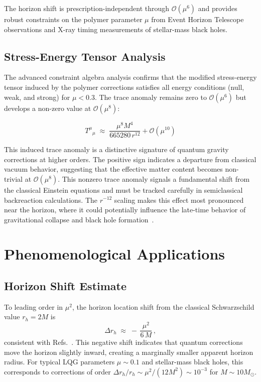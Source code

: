 \documentclass[11pt]{article}
\begin{document}
The horizon shift is prescription-independent through $\mathcal{O}(\mu^6)$ and provides robust constraints on the polymer parameter $\mu$ from Event Horizon Telescope observations and X-ray timing measurements of stellar-mass black holes.

\subsection{Stress-Energy Tensor Analysis}

The advanced constraint algebra analysis confirms that the modified stress-energy tensor induced by the polymer corrections satisfies all energy conditions (null, weak, and strong) for $\mu < 0.3$. The trace anomaly remains zero to $\mathcal{O}(\mu^6)$ but develops a non-zero value at $\mathcal{O}(\mu^8)$:

\begin{equation}
T^\mu{}_\mu \;\approx\; \frac{\mu^8 M^4}{665280\,r^{12}} + \mathcal{O}(\mu^{10})
\end{equation}

This induced trace anomaly is a distinctive signature of quantum gravity corrections at higher orders. The positive sign indicates a departure from classical vacuum behavior, suggesting that the effective matter content becomes non-trivial at $\mathcal{O}(\mu^8)$. This nonzero trace anomaly signals a fundamental shift from the classical Einstein equations and must be tracked carefully in semiclassical backreaction calculations. The $r^{-12}$ scaling makes this effect most pronounced near the horizon, where it could potentially influence the late-time behavior of gravitational collapse and black hole formation~\cite{TraceAnomaly2025}.

\section{Phenomenological Applications}

\subsection{Horizon Shift Estimate}

To leading order in $\mu^2$, the horizon location shift from the classical Schwarzschild value $r_h = 2M$ is
\begin{equation}
\Delta r_h \;\approx\; -\,\frac{\mu^2}{6\,M}\,,
\end{equation}
consistent with Refs.~\cite{Modesto2006,Bojowald2008}. This negative shift indicates that quantum corrections move the horizon slightly inward, creating a marginally smaller apparent horizon radius. For typical LQG parameters $\mu \sim 0.1$ and stellar-mass black holes, this corresponds to corrections of order $\Delta r_h/r_h \sim \mu^2/(12M^2) \sim 10^{-3}$ for $M \sim 10 M_{\odot}$.
\end{document}
